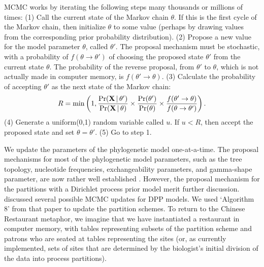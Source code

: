 \documentclass[11pt]{article}
\newcommand{\given}{\ensuremath{\,|\,}}
\begin{document}
MCMC works by iterating the following steps many thousands or millions of times: 
(1) Call the current state of the Markov chain $\theta$.
If this is the first cycle of the Markov chain, then initialize $\theta$ to some value (perhaps by drawing values from the corresponding prior probability distribution).
(2) Propose a new value for the model parameter $\theta$, called $\theta'$.
The proposal mechanism must be stochastic, with a probability of $f(\theta \rightarrow \theta')$ of choosing the proposed state $\theta'$ from the current state $\theta$.
The probability of the reverse proposal, from $\theta'$ to $\theta$, which is not actually made in computer memory, is $f(\theta' \rightarrow \theta)$. 
(3) Calculate the probability of accepting $\theta'$ as the next state of the Markov chain:
\begin{align} \label{eq:acceptance_prob}
R = \min \left(1, {\Pr(\mathbf{X} \given \theta') \over \Pr(\mathbf{X} \given \theta)} \times {\Pr(\theta') \over \Pr(\theta)} 
\times {f(\theta' \rightarrow \theta) \over f(\theta \rightarrow \theta')} \right).
\end{align}
(4) Generate a uniform(0,1) random variable called $u$. If $u < R$, then accept the proposed state and set $\theta = \theta'$. 
(5) Go to step 1.

We update the parameters of the phylogenetic model one-at-a-time.
The proposal mechanisms for most of the phylogenetic model parameters, such as the tree topology, nucleotide frequencies, exchangeability parameters, and gamma-shape parameter, are now rather well established \citep[{\it e.g.},][]{larget99,holder05,lakner08}.
However, the proposal mechanism for the partitions with a Dirichlet process prior model merit further discussion.
\citet{neal00} discussed several possible MCMC updates for DPP models.
We used `Algorithm 8' from that paper to update the partition schemes. 
To return to the Chinese Restaurant metaphor, we imagine that we have instantiated a restaurant in computer memory, with tables
representing subsets of the partition scheme and patrons who are seated at tables representing the sites (or, as currently implemented, sets of sites that
are determined by the biologist's initial division of the data into process partitions).
\end{document}
